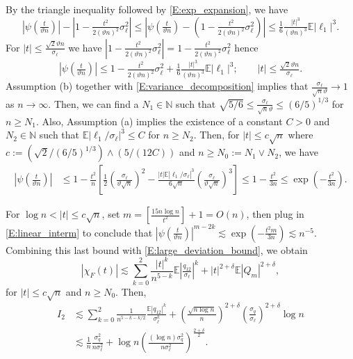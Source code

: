 \documentclass[11pt]{article}
\numberwithin{equation}{section}
\theoremstyle{definition}
\newcommand{\E}{\mathbb{E}}
\newcommand{\N}{\mathbb{N}}
\def\ls{\lesssim}
\newcommand{\Scale}{\vartheta}
\begin{document}
By the triangle inequality followed by \eqref{E:exp_expansion}, we have
\[|\psi\left(\tfrac{t}{\Scale n}\right)|-| 1 - \tfrac{t^2}{2(\Scale n)^2}\sigma_\ell^2|\leq |\psi\left(\tfrac{t}{\Scale n}\right) - (1 - \tfrac{t^2}{2(\Scale n)^2}\sigma_\ell^2)|\leq \tfrac{1}{6}\tfrac{|t|^3}{(\Scale n)^3}\E|\ell_1|^3.\]
For $|t|\leq \tfrac{\sqrt{2}\Scale n}{\sigma_\ell}$ we have $| 1 - \tfrac{t^2}{2(\Scale n)^2}\sigma_\ell^2| =  1 - \tfrac{t^2}{2(\Scale n)^2}\sigma_\ell^2$ hence
\[
|\psi\left(\tfrac{t}{\Scale n}\right)| \leq  1 - \tfrac{t^2}{2(\Scale n)^2}\sigma_\ell^2 + \tfrac{1}{6}\tfrac{|t|^3}{(\Scale n)^3}\E|\ell_1|^3;\qquad |t|\leq \tfrac{\sqrt{2}\Scale n}{\sigma_\ell}.
\]
Assumption (b) together with \eqref{E:variance_decomposition} implies that $\tfrac{\sigma_\ell}{\sqrt{n}\Scale}\to 1$ as $n\to\infty$. Then, we can find a $N_1\in\N$ such that $\sqrt{5/6}\leq \tfrac{\sigma_\ell}{\sqrt{n}\Scale} \leq (6/5)^{1/3}$ for $n\geq N_1$. Also, Assumption (a) implies the existence of a constant $C>0$ and $N_2\in\N$ such that $\E|\ell_1/\sigma_\ell|^3\leq C$ for $n\geq N_2$. Then, for $|t|\leq c\sqrt{n}$ where $c:= (\sqrt{2}/(6/5)^{1/3})\land (5/(12C))$ and $n\geq N_0:=N_1\lor N_2$, we have
\begin{align}\label{E:linear_interm}
|\psi\left(\tfrac{t}{\Scale n}\right)| &\leq 1 - \frac{t^2}{n}\left[\frac{1}{2}\left(\frac{\sigma_\ell}{\Scale \sqrt{n}}\right)^2 - \frac{|t|\E|\ell_1/\sigma_\ell|^3}{6\sqrt{n}}\left(\frac{\sigma_\ell}{\Scale \sqrt{n}}\right)^3\right] \leq 1 - \frac{t^2}{3n}\leq \exp(-\tfrac{t^2}{3n}).
\end{align}

For $\log n <|t|\leq c\sqrt{n}$, set $m=[\tfrac{15 n\log n}{t^2}]+1=O(n)$, then plug in \eqref{E:linear_interm} to conclude that $|\psi\left(\tfrac{t}{\Scale n}\right)|^{m-2k} \ls\exp(-\tfrac{t^2m}{3n})\ls n^{-5}$. Combining this last bound with \eqref{E:large_deviation_bound}, we obtain
\begin{equation}\label{E:cf_interm}
|\chi_F(t)|\ls\sum_{k=0}^2 \frac{|t|^k}{n^{5-k}} \E\left|\tfrac{q_{12}}{\sigma_\ell}\right|^k  + |t|^{2+\delta}\E|Q_{m}|^{2+\delta},
\end{equation}
for $|t|\leq c\sqrt{n}$  and $n\geq N_0$. Then,
\begin{align*}
    I_2
    &\ls\sum_{k=0}^2  \frac{1}{n^{5-k-k/2}} \frac{\E|q_{12}|^k}{\sigma_\ell^k}  + 	\left(\frac{\sqrt{n\log n}}{n}\right)^{2+\delta}\left(\tfrac{\sigma_q}{\sigma_\ell}\right)^{2+\delta}\log n \\
    &\ls \frac{1}{n} \frac{\sigma_q^2}{n\sigma_\ell^2}  + 	\log n\left(\frac{(\log n)\sigma_q^2}{n\sigma_\ell^2}\right)^{\tfrac{2+\delta}{2}}.
\end{align*} 
 
\end{document}
